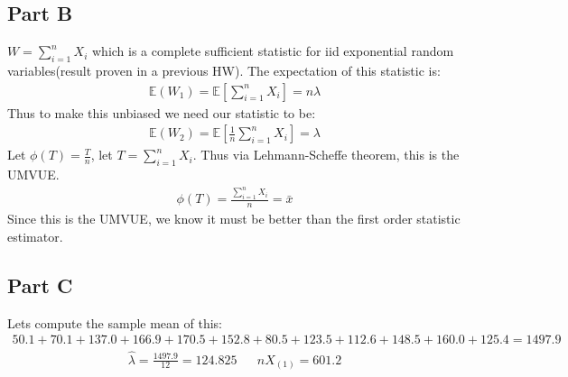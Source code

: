 \documentclass{article}
\begin{document}
\subsection*{Part B}
$W=\sum_{i=1}^{n} X_i$ which is a complete sufficient statistic for iid exponential random variables(result proven in a previous HW). The expectation of this statistic is:
\begin{align*}
\mathbb{E}(W_1) =\mathbb{E}[ \sum_{i=1}^{n} X_i ] =n\lambda
\end{align*}
Thus to make this unbiased we need our statistic to be:
\begin{align*}
\mathbb{E}(W_2) =\mathbb{E}[ \frac{1}{n} \sum_{i=1}^{n} X_i ] = \lambda
\end{align*}
Let $\phi(T) = \frac{T}{n}$, let $T=\sum_{i=1}^{n} X_i$.
Thus via Lehmann-Scheffe theorem, this is the UMVUE.
\begin{align*}
\boxed{ \phi(T) = \frac{\sum_{i=1}^{n} X_i}{n} = \bar{x}}
\end{align*}
Since this is the UMVUE, we know it must be better than the first order statistic estimator. %

\clearpage
\subsection*{Part C}
Lets compute the sample mean of this:
\begin{align*}
50.1+70.1+137.0+166.9+170.5+152.8+80.5+123.5+112.6+148.5+160.0+125.4 = 1497.9
\end{align*}
\begin{align*}
\boxed{ \hat{\lambda} = \frac{1497.9}{12} = 124.825 } &&\boxed{ nX_{(1)} = 601.2 }
\end{align*}
\end{document}
